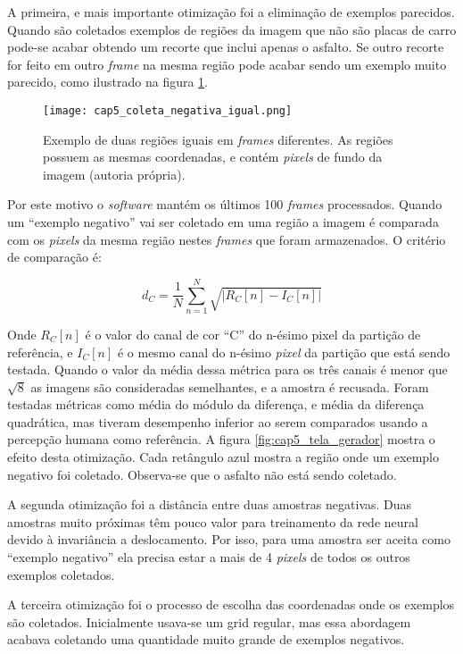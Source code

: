 A primeira, e mais importante otimização foi a eliminação de exemplos
parecidos. Quando são coletados exemplos de regiões da imagem que não são
placas de carro pode-se acabar obtendo um recorte que inclui apenas o asfalto.
Se outro recorte for feito em outro \emph{frame} na mesma região pode acabar
sendo um exemplo muito parecido, como ilustrado na figura
\ref{fig:cap5_coleta_negativa_igual}.

\begin{figure}[!htb]
	\centering
	\texttt{[image: cap5\_coleta\_negativa\_igual.png]}
	\caption[Exemplo de duas regiões iguais em \emph{frames} diferentes]{
		Exemplo de duas regiões iguais em \emph{frames} diferentes.
		As regiões possuem as mesmas coordenadas, e contém \emph{pixels} de fundo
		da imagem (autoria própria).}
	\label{fig:cap5_coleta_negativa_igual}
\end{figure}

Por este motivo o \emph{software} mantém os últimos 100 \emph{frames}
processados.
Quando um ``exemplo negativo'' vai ser coletado em uma região a imagem é
comparada com os \emph{pixels} da mesma região nestes \emph{frames} que foram
armazenados. O critério de comparação é:

\begin{equation}
	d_C=\frac{1}{N} \sum_{n=1}^N \sqrt{\left| R_C [n] -I_C [n] \right|}
\end{equation}

Onde $R_C[n]$ é o valor do canal de cor ``C'' do n-ésimo pixel da partição de
referência, e $I_C[n]$ é o mesmo canal do n-ésimo \emph{pixel} da
partição que está sendo testada. Quando o valor da média dessa métrica
para os três canais é menor que $\sqrt{8}$ as imagens são consideradas
semelhantes, e a amostra é recusada. Foram
testadas métricas como média do módulo da diferença, e média da diferença
quadrática, mas tiveram desempenho inferior ao serem comparados usando a
percepção humana como referência. A figura
\ref{fig:cap5_tela_gerador} mostra o efeito desta otimização.
Cada retângulo azul mostra a região onde um exemplo negativo foi coletado.
Observa-se que o asfalto não está sendo coletado.

A segunda otimização foi a distância entre duas amostras negativas. Duas
amostras muito próximas têm pouco valor para treinamento da rede neural devido
à invariância a deslocamento. Por isso, para uma amostra ser aceita como
``exemplo negativo'' ela precisa estar a mais de 4 \emph{pixels} de todos os
outros exemplos coletados.

A terceira otimização foi o processo de escolha das coordenadas onde os
exemplos são coletados. Inicialmente usava-se um grid regular, mas essa
abordagem acabava coletando uma quantidade muito grande de exemplos negativos.


